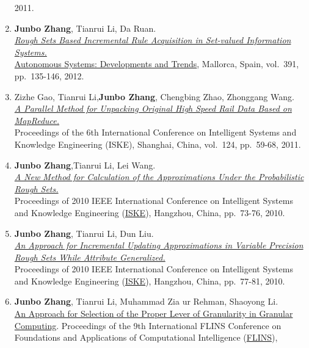 \documentclass[]{article}
\begin{document}
\begin{enumerate}
  2011.
\item
  \textbf{Junbo Zhang}, Tianrui Li, Da Ruan.\\
  \href{http://dx.doi.org/10.1007/978-3-642-24806-1_11}{\emph{Rough Sets
  Based Incremental Rule Acquisition in Set-valued Information
  Systems.}}\\
  \href{http://www.fernuni-hagen.de/kn/phdseminar11/index_en.html}{Autonomous
  Systems: Developments and Trends}, Mallorca, Spain, vol.~391,
  pp.~135-146, 2012.
\item
  Zizhe Gao, Tianrui Li,\textbf{Junbo Zhang}, Chengbing Zhao, Zhonggang
  Wang.\\ \href{http://dx.doi.org/10.1007/978-3-642-25658-5_8}{\emph{A
  Parallel Method for Unpacking Original High Speed Rail Data Based on
  MapReduce.}}\\ Proceedings of the 6th International Conference on
  Intelligent Systems and Knowledge Engineering (ISKE), Shanghai, China,
  vol.~124, pp.~59-68, 2011.
\item
  \textbf{Junbo Zhang},Tianrui Li, Lei Wang.\\
  \href{http://dx.doi.org/10.1109/ISKE.2010.5680797}{\emph{A New Method
  for Calculation of the Approximations Under the Probabilistic Rough
  Sets.}}\\ Proceedings of 2010 IEEE International Conference on
  Intelligent Systems and Knowledge Engineering
  (\href{http://ieeexplore.ieee.org/xpl/mostRecentIssue.jsp?punumber=5676709}{ISKE}),
  Hangzhou, China, pp.~73-76, 2010.
\item
  \textbf{Junbo Zhang}, Tianrui Li, Dun Liu.\\
  \href{http://dx.doi.org/10.1109/ISKE.2010.5680798}{\emph{An Approach
  for Incremental Updating Approximations in Variable Precision Rough
  Sets While Attribute Generalized.}}\\ Proceedings of 2010 IEEE
  International Conference on Intelligent Systems and Knowledge
  Engineering
  (\href{http://ieeexplore.ieee.org/xpl/mostRecentIssue.jsp?punumber=5676709}{ISKE}),
  Hangzhou, China, pp.~77-81, 2010.
\item
  \textbf{Junbo Zhang}, Tianrui Li, Muhammad Zia ur Rehman, Shaoyong
  Li.\\ \href{http://dx.doi.org/10.1142/9789814324700_0116}{An Approach
  for Selection of the Proper Lever of Granularity in Granular
  Computing}. Proceedings of the 9th International FLINS Conference on
  Foundations and Applications of Computational Intelligence
  (\href{http://www.wikicfp.com/cfp/servlet/event.showcfp?eventid=7359\&copyownerid=2}{FLINS}),

\end{enumerate}
\end{document}
